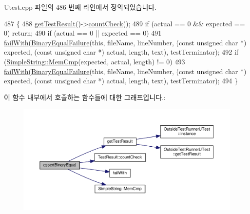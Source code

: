 Utest.\+cpp 파일의 486 번째 라인에서 정의되었습니다.


\begin{DoxyCode}
487 \{
488     \hyperlink{class_utest_shell_a34c525b685e30431750d9e355fdfff0c}{getTestResult}()->\hyperlink{class_test_result_a58577489a2418efb4c440761e533f2e7}{countCheck}();
489     \textcolor{keywordflow}{if} (actual == 0 && expected == 0) \textcolor{keywordflow}{return};
490     \textcolor{keywordflow}{if} (actual == 0 || expected == 0)
491         \hyperlink{class_utest_shell_ad50ae28f5ad9f1d224832cb1f89365a7}{failWith}(\hyperlink{class_binary_equal_failure}{BinaryEqualFailure}(\textcolor{keyword}{this}, fileName, lineNumber, (\textcolor{keyword}{const} \textcolor{keywordtype}{unsigned} \textcolor{keywordtype}{
      char} *) expected, (\textcolor{keyword}{const} \textcolor{keywordtype}{unsigned} \textcolor{keywordtype}{char} *) actual, length, text), testTerminator);
492     \textcolor{keywordflow}{if} (\hyperlink{class_simple_string_ae43fb6d44bec574894191bf16b4096e7}{SimpleString::MemCmp}(expected, actual, length) != 0)
493         \hyperlink{class_utest_shell_ad50ae28f5ad9f1d224832cb1f89365a7}{failWith}(\hyperlink{class_binary_equal_failure}{BinaryEqualFailure}(\textcolor{keyword}{this}, fileName, lineNumber, (\textcolor{keyword}{const} \textcolor{keywordtype}{unsigned} \textcolor{keywordtype}{
      char} *) expected, (\textcolor{keyword}{const} \textcolor{keywordtype}{unsigned} \textcolor{keywordtype}{char} *) actual, length, text), testTerminator);
494 \}
\end{DoxyCode}


이 함수 내부에서 호출하는 함수들에 대한 그래프입니다.\+:
\nopagebreak
\begin{figure}[H]
\begin{center}
\leavevmode
\includegraphics[width=350pt]{class_utest_shell_a6dbe5191c5d05ec4a24eb51c76f79dfa_cgraph}
\end{center}
\end{figure}


